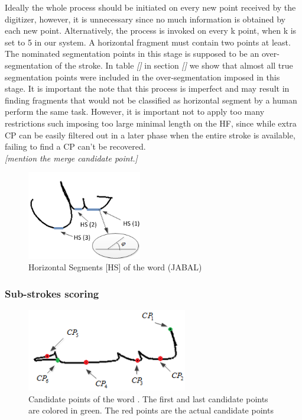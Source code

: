 \documentclass[journal,compsoc]{IEEEtran}
\begin{document}
Ideally the whole process should be initiated on every new point received by the digitizer, however, it is unnecessary since no much information is obtained by each new point. Alternatively, the process is invoked on every k point, when k is set to 5 in our system. A horizontal fragment must contain two points at least.\\

The nominated segmentation points in this stage is supposed to be an over-segmentation of the stroke. In table \emph{[]} in section \emph{[]} we show that almost all true segmentation points were included in the over-segmentation imposed in this stage. 
It is important the note that this process is imperfect and may result in finding fragments that would not be classified as horizontal segment by a human perform the same task. However, it is important not to apply too many restrictions such imposing too large minimal length on the HF, since while extra CP can be easily filtered out in a later phase when the entire stroke is available, failing to find a CP can't be recovered.\\

\emph{[mention the merge candidate point.]}


\begin{figure}
\centering
\includegraphics[width=5cm]{./figures/horizontal_segments}
\caption{Horizontal Segments [HS] of the word (JABAL)}
\label{fig:horizontal_segments}
\end{figure}

\subsubsection{Sub-strokes scoring}

\begin{figure}
\centering
\includegraphics[width=7cm]{./figures/candidate_points}
\caption{Candidate points of the word  . The first and last candidate points are colored in green. The red points are the actual candidate points}
\label{fig:candidate_points}
\end{figure}
\end{document}

